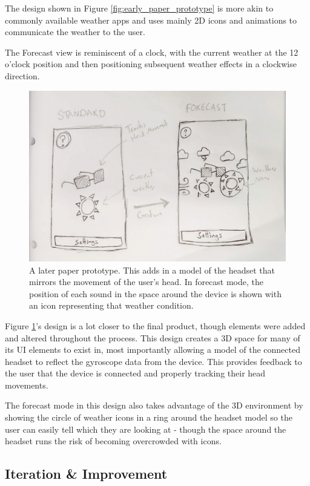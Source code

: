 \documentclass{l4proj}
\begin{document}
The design shown in Figure \ref{fig:early_paper_prototype} is more akin to commonly available weather apps and uses mainly 2D icons and animations to communicate the weather to the user.

The Forecast view is reminiscent of a clock, with the current weather at the 12 o'clock position and then positioning subsequent weather effects in a clockwise direction.

\begin{figure}[htb!]
    \centering
    \includegraphics[width=0.9\linewidth]{images/paper_proto_1.jpg}
    \caption{A later paper prototype. This adds in a model of the headset that mirrors the movement of the user's head. In forecast mode, the position of each sound in the space around the device is shown with an icon representing that weather condition.}
    \label{fig:paper_prototype_1}
\end{figure}

Figure \ref{fig:paper_prototype_1}'s design is a lot closer to the final product, though elements were added and altered throughout the process. 
This design creates a 3D space for many of its UI elements to exist in, most importantly allowing a model of the connected headset to reflect the gyroscope data from the device. This provides feedback to the user that the device is connected and properly tracking their head movements.

The forecast mode in this design also takes advantage of the 3D environment by showing the circle of weather icons in a ring around the headset model so the user can easily tell which they are looking at - though the space around the headset runs the risk of becoming overcrowded with icons.


\subsection{Iteration \& Improvement}
\end{document}

